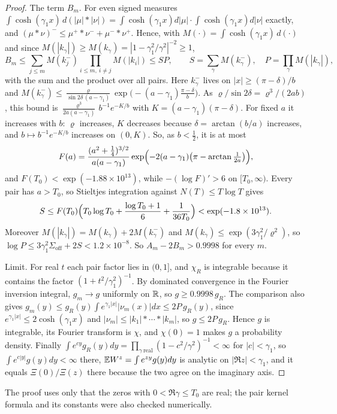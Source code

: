 \begin{proof}
The term $B_m$. For even signed measures $\int\cosh(\gamma_1x)\,d(|\mu|*|\nu|)=\int\cosh(\gamma_1 x)d|\mu|\cdot\int\cosh(\gamma_1x)d|\nu|$ exactly, and $(\mu*\nu)^-\le\mu^+*\nu^-+\mu^-*\nu^+$. Hence, with $M(\cdot)=\int\cosh(\gamma_1x)\,d(\cdot)$ and since $M(|k_\gamma|)\ge M(k_\gamma)=|1-\gamma_1^2/\gamma^2|^{-2}\ge1$,
\[
B_m\le\sum_{j\le m}M(k_j^-)\prod_{i\le m,\ i\ne j}M(|k_i|)\le SP,\qquad S=\sum_\gamma M(k_\gamma^-),\quad P=\prod_\gamma M(|k_\gamma|),
\]
with the sum and the product over all pairs. Here $k_\gamma^-$ lives on $|x|\ge(\pi-\delta)/b$ and $M(k_\gamma^-)\le\frac{\varrho}{\sin2\delta\,(a-\gamma_1)}\exp\bigl(-(a-\gamma_1)\frac{\pi-\delta}{b}\bigr)$. As $\varrho/\sin2\delta=\varrho^3/(2ab)$, this bound is $\frac{\varrho^3}{2a(a-\gamma_1)}\,b^{-1}e^{-K/b}$ with $K=(a-\gamma_1)(\pi-\delta)$. For fixed $a$ it increases with $b$: $\varrho$ increases, $K$ decreases because $\delta=\arctan(b/a)$ increases, and $b\mapsto b^{-1}e^{-K/b}$ increases on $(0,K)$. So, as $b<\frac12$, it is at most
\[
F(a)=\frac{(a^2+\frac14)^{3/2}}{a(a-\gamma_1)}\exp\Bigl(-2(a-\gamma_1)\bigl(\pi-\arctan\tfrac1{2a}\bigr)\Bigr),
\]
and $F(T_0)<\exp(-1.88\times10^{13})$, while $-(\log F)'>6$ on $[T_0,\infty)$. Every pair has $a>T_0$, so Stieltjes integration against $N(T)\le T\log T$ gives
\[
S\le F(T_0)\Bigl(T_0\log T_0+\frac{\log T_0+1}6+\frac1{36T_0}\Bigr)<\exp(-1.8\times10^{13}).
\]
Moreover $M(|k_\gamma|)=M(k_\gamma)+2M(k_\gamma^-)$ and $M(k_\gamma)\le\exp(3\gamma_1^2/\varrho^2)$, so $\log P\le3\gamma_1^2\Sigma_{\mathrm{off}}+2S<1.2\times10^{-8}$. So $A_m-2B_m>0.9998$ for every $m$.

Limit. For real $t$ each pair factor lies in $(0,1]$, and $\chi_R$ is integrable because it contains the factor $(1+t^2/\gamma_1^2)^{-1}$. By dominated convergence in the Fourier inversion integral, $g_m\to g$ uniformly on $\mathbb{R}$, so $g\ge0.9998\,g_R$. The comparison also gives $g_m(y)\le g_R(y)\int e^{\gamma_1|x|}|\nu_m(x)|dx\le2P\,g_R(y)$, since $e^{\gamma_1|x|}\le2\cosh(\gamma_1x)$ and $|\nu_m|\le|k_1|*\cdots*|k_m|$, so $g\le2P\,g_R$. Hence $g$ is integrable, its Fourier transform is $\chi$, and $\chi(0)=1$ makes $g$ a probability density. Finally $\int e^{cy}g_R(y)dy=\prod_{\gamma\ \mathrm{real}}(1-c^2/\gamma^2)^{-1}<\infty$ for $|c|<\gamma_1$, so $\int e^{c|y|}g(y)dy<\infty$ there, $\mathbb{E} W^z=\int e^{zy}g(y)dy$ is analytic on $|\Re z|<\gamma_1$, and it equals $\Xi(0)/\Xi(z)$ there because the two agree on the imaginary axis.
\end{proof}

The proof uses only that the zeros with $0<\Re\gamma\le T_0$ are real; the pair kernel formula and its constants were also checked numerically.

